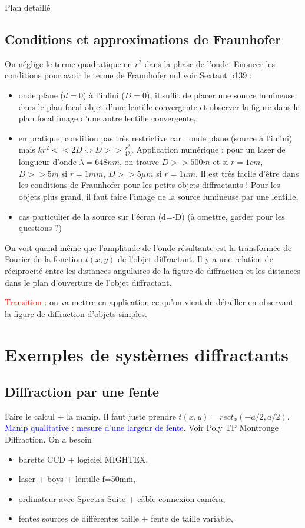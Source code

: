 \begin{reportBlock}{Plan détaillé}
  \subsection{Conditions et approximations de Fraunhofer}
  On néglige le terme quadratique en $r^2$ dans la phase de l'onde. Enoncer les conditions pour avoir le terme de Fraunhofer nul voir Sextant p139 :
  \begin{itemize}
      \item onde plane ($d=0$) à l'infini ($D=0$), il suffit de placer une source lumineuse dans le plan focal objet d'une lentille convergente et observer la figure dans le plan focal image d'une autre lentille convergente,
      \item en pratique, condition pas très restrictive car : onde plane (source à l'infini) mais $kr^2<<2D\Leftrightarrow D>>\frac{r^2}{4\lambda}$. Application numérique : pour un laser de longueur d'onde $\lambda=648nm$, on trouve $D>>500m$ et si $r=1cm$, $D>>5m$ si $r=1mm$, $D>>5\mu m$ si $r=1\mu m$. Il est très facile d'être dans les conditions de Fraunhofer pour les petits objets diffractants ! Pour les objets plus grand, il faut faire l'image de la source lumineuse par une lentille,
      \item cas particulier de la source sur l'écran (d=-D) (à omettre, garder pour les questions ?)
  \end{itemize}
  On voit quand même que l'amplitude de l'onde résultante est la transformée de Fourier de la fonction $t(x,y)$ de l'objet diffractant. Il y a une relation de réciprocité entre les distances angulaires de la figure de diffraction et les distances dans le plan d'ouverture de l'objet diffractant.

  \textcolor{red}{Transition :} on va mettre en application ce qu'on vient de détailler en observant la figure de diffraction d'objets simples.
  \section{Exemples de systèmes diffractants}
  
  \subsection{Diffraction par une fente}
  Faire le calcul + la manip. Il faut juste prendre $t(x,y)=rect_x(-a/2,a/2)$.\\
  \textcolor{blue}{Manip qualitative : mesure d'une largeur de fente}. Voir Poly TP Montrouge Diffraction. On a besoin 
  \begin{itemize}
      \item barette CCD + logiciel MIGHTEX,
      \item laser + boys + lentille f=50mm,
      \item ordinateur avec Spectra Suite + câble connexion caméra,
      \item fentes sources de différentes taille + fente de taille variable,
  \end{itemize}
  


\end{reportBlock}
